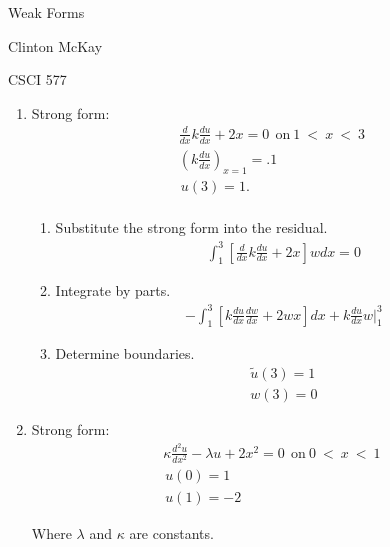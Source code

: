 \documentclass{article}[12pt]%
\begin{document}
\begin{flushright}
Weak Forms

Clinton McKay 

CSCI 577
\end{flushright}

\begin{enumerate}
    \item Strong form:
    \begin{align*} 
        \frac{d}{dx}k\frac{du}{dx} + 2x = 0~~\mathrm{on}~\mathrm{1} ~<~ x ~ < ~ \mathrm{3}\\
        \left( k\frac{du}{dx}\right)_{x=\mathrm{1}} = .1\\
        \frac{}{}u(\mathrm{3}) = \mathrm{1}.\\
    \end{align*}
    \begin{enumerate}
        \item Substitute the strong form into the residual. 
        \begin{align*}
          \int^3_1\left[\frac{d}{dx}k\frac{du}{dx} + 2x\right]wdx = 0  
        \end{align*}
        \item Integrate by parts. 
        \begin{align*}
            -\int^3_1\left[k\frac{du}{dx}\frac{dw}{dx} + 2wx\right]dx + k\frac{du}{dx}w \Big|^3_1
        \end{align*}
        \item Determine boundaries.
        \begin{align*}
            \widetilde{u}(3) = 1\\
            w(3) = 0
        \end{align*}
    \end{enumerate}
    
    \item Strong form:
    \begin{align*}
        \kappa \frac{d^2 u}{dx^2} - \lambda u + 2x^2 = 0~~\mathrm{on}~\mathrm{0} ~<~ x ~ < ~ \mathrm{1}\\
        \frac{}{}u(0) = 1\\
        \frac{}{}u(1) = -2
    \end{align*}

    Where $\lambda$ and $\kappa$ are constants.


\end{enumerate}
\end{document}
